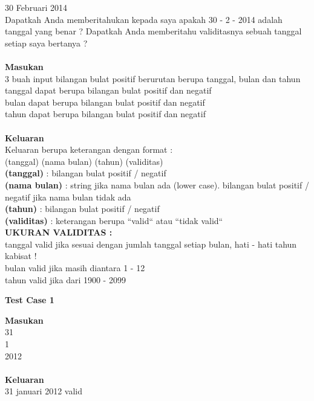 \newpage
\begin{permasalahan}{30 Februari 2014}\\
\label{prob:30Februari}
Dapatkah Anda memberitahukan kepada saya apakah 30 - 2 - 2014 adalah tanggal yang benar ?  Dapatkah Anda memberitahu validitasnya sebuah tanggal setiap saya bertanya ? \\\\
	\textbf{Masukan}\\
	3 buah input bilangan bulat positif berurutan berupa tanggal, bulan dan tahun\\
	tanggal dapat berupa bilangan bulat positif dan negatif\\
	bulan dapat berupa bilangan bulat positif dan negatif\\
	tahun dapat berupa bilangan bulat positif dan negatif\\\\
	\textbf{Keluaran}\\
	Keluaran berupa keterangan dengan format :\\
	(tanggal) (nama bulan) (tahun) (validitas)\\
	\textbf{(tanggal)} : bilangan bulat positif / negatif \\
	\textbf{(nama bulan)} : string jika nama bulan ada (lower case). bilangan bulat positif / negatif jika nama bulan tidak ada\\
	\textbf{(tahun)} : bilangan bulat positif / negatif\\
	\textbf{(validitas)} : keterangan berupa ``valid`` atau ``tidak valid``\\

	\textbf{UKURAN VALIDITAS : }\\
	tanggal valid jika sesuai dengan jumlah tanggal setiap bulan, hati - hati tahun kabisat ! \\
	bulan valid jika masih diantara 1 - 12 \\
	tahun valid jika dari 1900 - 2099 \\

	\begin{center}
	\textbf{Test Case 1}\\
	\end{center}
	\textbf{Masukan}\\
	31 \\
	1 \\
	2012 \\\\
	\textbf{Keluaran}\\
	31 januari 2012 valid \\\\
	

\end{permasalahan}
